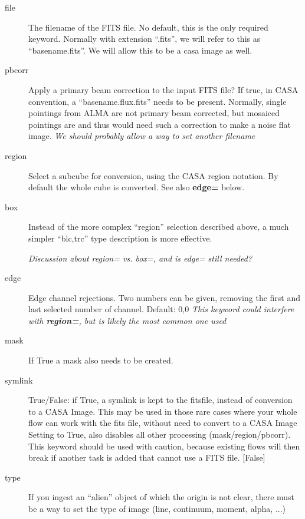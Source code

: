 \begin{description}

\item[file] The filename of the  FITS file. No default, this is the only required
keyword. Normally 
with extension ``.fits'', we will refer to this as ``basename.fits''. 
We will allow this to be a casa image as well.

\item[pbcorr] Apply a primary beam correction to the input FITS file? If true,
in CASA convention, a ``basename.flux.fits'' needs to be present. Normally,
single pointings from ALMA are not primary beam corrected, but mosaiced pointings
are and thus would need such a correction to make a noise flat image.
{\it We should probably allow a way to set another filename }

\item[region] Select a subcube for conversion, using the CASA region notation. By
default the whole cube is converted. See also {\bf edge=} below.

\item[box] Instead of the more complex ``region'' selection described above, a
much simpler ``blc,trc'' type description is more effective.

{\it Discussion about region= vs. box=, and is edge= still needed?}

\item[edge] Edge channel rejections. Two numbers can be given, removing the first
and last selected number of channel. Default: 0,0  {\it This keyword could
interfere with {\bf region=}, but is likely the most common one used}

\item[mask] If True a mask also needs to be created. 

\item[symlink]  True/False: if True, a symlink is kept to the fitsfile,
  instead of conversion to a CASA Image.
  This may be used in those rare cases where your whole flow can work
  with the fits file, without need to convert to a CASA Image
  Setting to True, also disables all other processing
  (mask/region/pbcorr). This keyword should be used with caution,
  because existing flows will then break if another task is added that
  cannot use a FITS file.
  [False]

\item[type]  If you ingest an ``alien'' object of which the origin
  is not clear, there must be a way to set the type of image
  (line, continuum, moment, alpha, ...)

\end{description}


